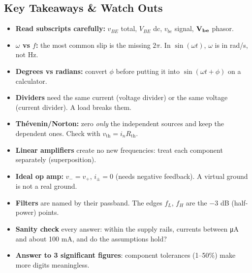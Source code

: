     \subsection[1.K]{Key Takeaways \& Watch Outs}
    \begin{itemize}
        \item \textbf{Read subscripts carefully:} $v_{BE}$ total, $V_{BE}$ dc, $v_{be}$ signal, $\mathbf{V_{be}}$ phasor.
        \item \textbf{$\omega$ vs $f$:} the most common slip is the missing $2\pi$. In $\sin(\omega t)$, $\omega$ is in rad/s, not Hz.
        \item \textbf{Degrees vs radians:} convert $\phi$ before putting it into $\sin(\omega t + \phi)$ on a calculator.
        \item \textbf{Dividers} need the same current (voltage divider) or the same voltage (current divider). A load breaks them.
        \item \textbf{Th\'evenin/Norton:} zero \textit{only} the independent sources and keep the dependent ones. Check with $v_{\mathrm{th}} = i_n R_{\mathrm{th}}$.
        \item \textbf{Linear amplifiers} create no new frequencies: treat each component separately (superposition).
        \item \textbf{Ideal op amp:} $v_- = v_+$, $i_\pm = 0$ (needs negative feedback). A virtual ground is not a real ground.
        \item \textbf{Filters} are named by their passband. The edges $f_L$, $f_H$ are the $-3$ dB (half-power) points.
        \item \textbf{Sanity check} every answer: within the supply rails, currents between \si{\micro\ampere} and about 100 mA, and do the assumptions hold?
        \item \textbf{Answer to 3 significant figures}: component tolerances (1--50\%) make more digits meaningless. 
    \end{itemize}

